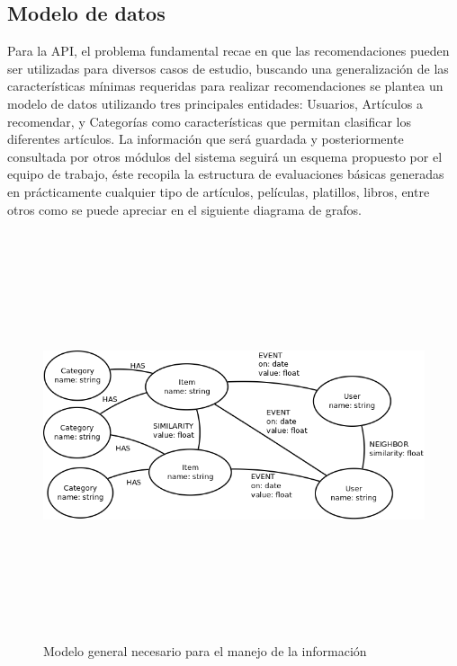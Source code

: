     \subsection{Modelo de datos}
      Para la API, el problema fundamental recae en que las recomendaciones pueden ser utilizadas para diversos casos de estudio, buscando una generalización de las características mínimas requeridas para realizar recomendaciones se plantea un modelo de datos utilizando tres principales entidades: Usuarios, Artículos a recomendar, y Categorías como características que permitan clasificar los diferentes artículos. La información que será guardada y posteriormente consultada por otros módulos del sistema seguirá un esquema propuesto por el equipo de trabajo, éste recopila la estructura de evaluaciones básicas generadas en prácticamente cualquier tipo de artículos, películas, platillos, libros, entre otros como se puede apreciar en el siguiente diagrama de grafos.

      \newpage
          \begin{landscape}
            \begin{figure}[h!]
            \centering
            \includegraphics[width=22.5cm,height=12cm]{./images/general_data_model.png}
            \caption{Modelo general necesario para el manejo de la información}
          \end{figure}
          \end{landscape}
        \newpage

